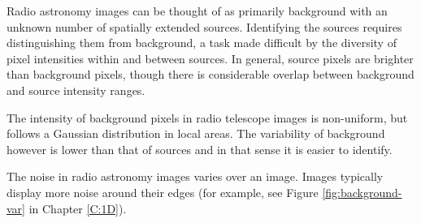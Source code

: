 Radio astronomy images can be thought of as primarily background with an unknown number of spatially extended sources. Identifying the sources requires distinguishing them from background, a task made difficult by the diversity of pixel intensities within and between sources. In general, source pixels are brighter than background pixels, though there is considerable overlap between background and source intensity ranges. 

The intensity of background pixels in radio telescope images is non-uniform, but follows a Gaussian distribution in local areas. The variability of background however is lower than that of sources and in that sense it is easier to identify.

The noise in radio astronomy images varies over an image. Images typically display more noise around their edges (for example, see Figure \ref{fig:background-var} in Chapter \ref{C:1D}).

